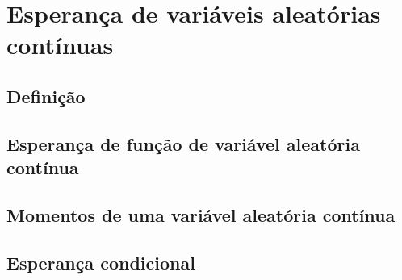 \documentclass[../Notas.tex]{subfiles}
\begin{document}
\section{Esperança de variáveis aleatórias contínuas}

\subsection{Definição}

\subsection{Esperança de função de variável aleatória contínua}

\subsection{Momentos de uma variável aleatória contínua}

\subsection{Esperança condicional}
\end{document}
